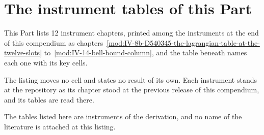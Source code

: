 \section{The instrument tables of this Part}\label{mod:V-L-the-instrument-tables-at-the-repository}
\begin{chtable}\label{box:V-L-the-instrument-tables-at-the-repository:1}
This Part lists 12 instrument chapters, printed among the instruments at the end of this compendium as chapters~\ref{mod:IV-8b-D540345-the-lagrangian-table-at-the-twelve-slots} to~\ref{mod:IV-14-bell-bound-column}, and the table beneath names each one with its key cells.
\end{chtable}
The listing moves no cell and states no result of its own. Each instrument stands at the repository as its chapter stood at the previous release of this compendium, and its tables are read there.
\begin{chbridge}
The tables listed here are instruments of the derivation, and no name of the literature is attached at this listing.
\end{chbridge}
